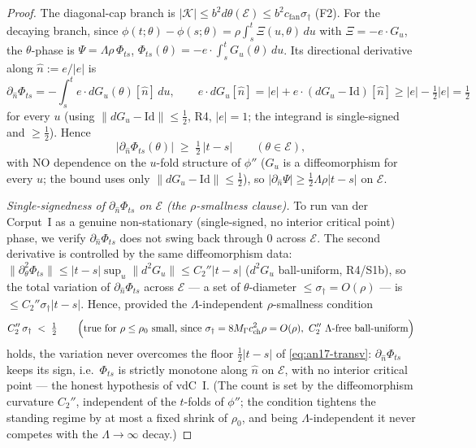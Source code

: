 \begin{proof}
The diagonal-cap branch is $|\mathcal K|\le b^2 d\theta(\mathcal E)\le b^2
c_{\mathrm{fan}}\sigma_\dagger$ (F2). For the decaying branch, since
$\phi(t;\theta)-\phi(s;\theta)=\rho\int_s^t\Xi(u,\theta)\,du$ with $\Xi=-e\cdot
G_u$, the $\theta$-phase is $\Psi=\Lambda\rho\,\Phi_{ts}$,
$\Phi_{ts}(\theta)=-e\cdot\int_s^t G_u(\theta)\,du$. Its directional derivative
along $\hat n:=e/|e|$ is
\[
 \partial_{\hat n}\Phi_{ts}=-\!\int_s^t e\cdot dG_u(\theta)[\hat n]\,du,
 \qquad
 e\cdot dG_u[\hat n]=|e|+e\cdot(dG_u-\mathrm{Id})[\hat n]\ge|e|-\tfrac12|e|=\tfrac12
\]
for every $u$ (using $\|dG_u-\mathrm{Id}\|\le\tfrac12$, R4, $|e|=1$; the integrand
is single-signed and $\ge\tfrac12$). Hence
\begin{equation}\label{eq:an17-transv}
 |\partial_{\hat n}\Phi_{ts}(\theta)|\;\ge\;\tfrac12\,|t-s|
 \qquad(\theta\in\mathcal E),
\end{equation}
with NO dependence on the $u$-fold structure of $\phi''$ ($G_u$ is a diffeomorphism
for every $u$; the bound uses only $\|dG_u-\mathrm{Id}\|\le\tfrac12$), so
$|\partial_{\hat n}\Psi|\ge\tfrac12\Lambda\rho|t-s|$ on $\mathcal E$.

\emph{Single-signedness of $\partial_{\hat n}\Phi_{ts}$ on $\mathcal E$ (the
$\rho$-smallness clause).} To run van der Corput~I as a genuine non-stationary
(single-signed, no interior critical point) phase, we verify $\partial_{\hat n}
\Phi_{ts}$ does not swing back through $0$ across $\mathcal E$. The second
derivative is controlled by the same diffeomorphism data:
$\|\partial_\theta^2\Phi_{ts}\|\le|t-s|\sup_u\|d^2G_u\|\le C_2''|t-s|$ ($d^2G_u$
ball-uniform, R4/S1b), so the total variation of $\partial_{\hat n}\Phi_{ts}$
across $\mathcal E$ --- a set of $\theta$-diameter $\le\sigma_\dagger=O(\rho)$ --- is
$\le C_2''\sigma_\dagger|t-s|$. Hence, provided the $\Lambda$-independent
$\rho$-smallness condition
\begin{equation}\label{eq:an17-singlesign}
 C_2''\,\sigma_\dagger\;<\;\tfrac12
 \qquad\Bigl(\text{true for }\rho\le\rho_0\text{ small, since }\sigma_\dagger=
 8M_\Gamma c_{\mathrm{ch}}^2\rho=O(\rho),\ C_2''\ \Lambda\text{-free ball-uniform}
 \Bigr)
\end{equation}
holds, the variation never overcomes the floor $\tfrac12|t-s|$ of
\eqref{eq:an17-transv}: $\partial_{\hat n}\Phi_{ts}$ keeps its sign, i.e.\
$\Phi_{ts}$ is strictly monotone along $\hat n$ on $\mathcal E$, with no interior
critical point --- the honest hypothesis of vdC~I. (The count is set by the
diffeomorphism curvature $C_2''$, independent of the $t$-folds of $\phi''$; the
condition tightens the standing regime by at most a fixed shrink of $\rho_0$, and
being $\Lambda$-independent it never competes with the $\Lambda\to\infty$ decay.)


\end{proof}
